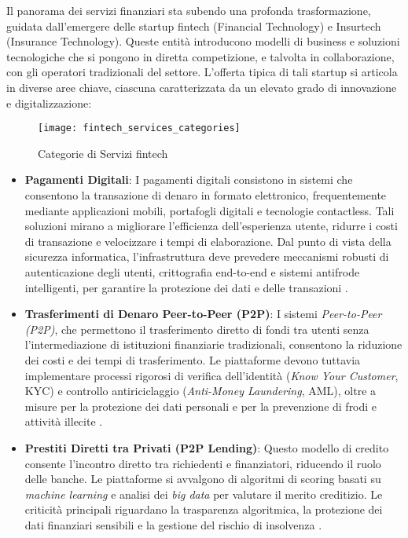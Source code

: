Il panorama dei servizi finanziari sta subendo una profonda trasformazione, guidata dall'emergere delle startup fintech (Financial Technology) e Insurtech (Insurance Technology). Queste entità introducono modelli di business e soluzioni tecnologiche che si pongono in diretta competizione, e talvolta in collaborazione, con gli operatori tradizionali del settore. L'offerta tipica di tali startup si articola in diverse aree chiave, ciascuna caratterizzata da un elevato grado di innovazione e digitalizzazione:

\begin{figure}[htbp]
\centering
\texttt{[image: fintech\_services\_categories]}
\caption{Categorie di Servizi fintech}
\label{fig:fintech_services}
\end{figure}

\begin{itemize}
    \item \textbf{Pagamenti Digitali}: I pagamenti digitali consistono in sistemi che consentono la transazione di denaro in formato elettronico, frequentemente mediante applicazioni mobili, portafogli digitali e tecnologie contactless. Tali soluzioni mirano a migliorare l'efficienza dell'esperienza utente, ridurre i costi di transazione e velocizzare i tempi di elaborazione. Dal punto di vista della sicurezza informatica, l'infrastruttura deve prevedere meccanismi robusti di autenticazione degli utenti, crittografia end-to-end e sistemi antifrode intelligenti, per garantire la protezione dei dati e delle transazioni \cite{zhang2020digital}.
    
    \item \textbf{Trasferimenti di Denaro Peer-to-Peer (P2P)}: I sistemi \textit{Peer-to-Peer (P2P)}, che permettono il trasferimento diretto di fondi tra utenti senza l'intermediazione di istituzioni finanziarie tradizionali, consentono la riduzione dei costi e dei tempi di trasferimento. Le piattaforme devono tuttavia implementare processi rigorosi di verifica dell'identità (\textit{Know Your Customer}, KYC) e controllo antiriciclaggio (\textit{Anti-Money Laundering}, AML), oltre a misure per la protezione dei dati personali e per la prevenzione di frodi e attività illecite \cite{zhang2020digital}.
    
    \item \textbf{Prestiti Diretti tra Privati (P2P Lending)}: Questo modello di credito consente l'incontro diretto tra richiedenti e finanziatori, riducendo il ruolo delle banche. Le piattaforme si avvalgono di algoritmi di scoring basati su \textit{machine learning} e analisi dei \textit{big data} per valutare il merito creditizio. Le criticità principali riguardano la trasparenza algoritmica, la protezione dei dati finanziari sensibili e la gestione del rischio di insolvenza \cite{milne2016p2p}.
    

\end{itemize}
